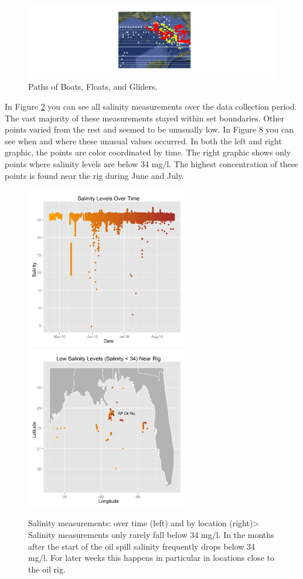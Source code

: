 \documentclass[11pt]{article}
\begin{document}
\begin{figure}[htbp] %
   \centering
   \includegraphics[width=5in]{boats-floats-gliders.png} 
   \caption{Paths of Boats, Floats, and Gliders. }
   \label{Boats, Floats and Gliders}
\end{figure}
In Figure \ref {salinity-timeline} you can see all salinity measurements over the data collection period. The vast majority of these measurements stayed within set boundaries. Other points varied from the rest and seemed to be unusually low. In Figure 8 you can see when and where these unusual values occurred. In both the left and right graphic, the points are color coordinated by time. The right graphic shows only points where salinity levels are below 34 mg/l. The highest concentration of these points is found near the rig during June and July.
\begin{figure}[htbp] %
   \centering
   \includegraphics[width=2.8in]{salinity-time.png} 
   \includegraphics[width=2.8in]{salinity-map.png} 
   \caption{Salinity measurements: over time (left) and by location (right)> Salinity measurements only rarely fall below 34 mg/l. In the months after the start of the oil spill salinity frequently drops below 34 mg/l. For later weeks this happens in particular in locations close to the oil rig.}
   \label{salinity-timeline}
\end{figure}
\end{document}
